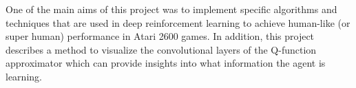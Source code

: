 One of the main aims of this project was to implement specific algorithms and techniques that are used in deep reinforcement learning to achieve human-like (or super human) performance in Atari 2600 games. In addition, this project describes a method to visualize the convolutional layers of the Q-function approximator which can provide insights into what information the agent is learning.